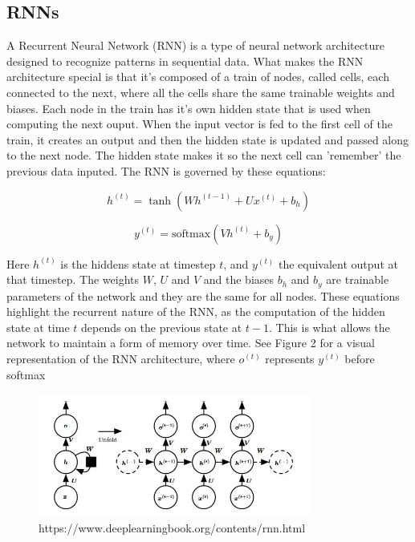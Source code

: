 \documentclass[11pt]{article}
\begin{document}
\subsection{RNNs}
A Recurrent Neural Network (RNN) is a type of neural network architecture designed to recognize patterns in sequential data. What makes the RNN architecture special is that it's composed of a train of nodes, called cells, each connected to the next, where all the cells share the same trainable weights and biases. Each node in the train has it's own hidden state that is used when computing the next ouput. When the input vector is fed to the first cell of the train, it creates an output and then the hidden state is updated and passed along to the next node. The hidden state makes it so the next cell can 'remember' the previous data inputed. The RNN is governed by these equations:

\begin{equation}
h^{(t)} = \tanh(Wh^{(t-1)} + Ux^{(t)} + b_h)
\end{equation}

\begin{equation}
y^{(t)} = \text{softmax}(Vh^{(t)} + b_y)
\end{equation}

Here \(h^{(t)}\) is the hiddens state at timestep $t$, and \(y^{(t)}\) the equivalent output at that timestep. The weights $W$, $U$ and $V$ and the biases $b_h$ and $b_y$ are trainable parameters of the network and they are the same for all nodes. These equations highlight the recurrent nature of the RNN, as the computation of the hidden state at time $t$ depends on the previous state at $t-1$. This is what allows the network to maintain a form of memory over time. See Figure 2 for a visual representation of the RNN architecture, where $o^{(t)}$ represents $y^{(t)}$ before softmax

\begin{figure}[h]
\centering
\includegraphics[width=0.8\textwidth]{rnn_diagram.jpeg}
\caption{https://www.deeplearningbook.org/contents/rnn.html}
\end{figure}
\end{document}
